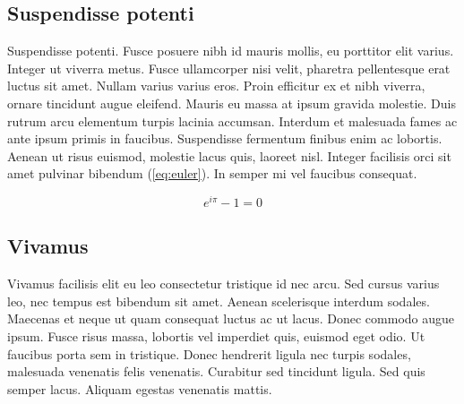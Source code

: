 \subsection{Suspendisse potenti}
Suspendisse potenti. Fusce posuere nibh id mauris mollis, eu porttitor elit varius. Integer ut viverra metus. Fusce ullamcorper nisi velit, pharetra pellentesque erat luctus sit amet. Nullam varius varius eros. Proin efficitur ex et nibh viverra, ornare tincidunt augue eleifend. Mauris eu massa at ipsum gravida molestie. Duis rutrum arcu elementum turpis lacinia accumsan. Interdum et malesuada fames ac ante ipsum primis in faucibus. Suspendisse fermentum finibus enim ac lobortis. Aenean ut risus euismod, molestie lacus quis, laoreet nisl. Integer facilisis orci sit amet pulvinar bibendum (\ref{eq:euler}). In semper mi vel faucibus consequat.

\begin{equation}\label{eq:euler}
    e^{i\pi} -1 = 0
\end{equation}

\subsection{Vivamus}
Vivamus facilisis elit eu leo consectetur tristique id nec arcu. Sed cursus varius leo, nec tempus est bibendum sit amet. Aenean scelerisque interdum sodales. Maecenas et neque ut quam consequat luctus ac ut lacus. Donec commodo augue ipsum. Fusce risus massa, lobortis vel imperdiet quis, euismod eget odio. Ut faucibus porta sem in tristique. Donec hendrerit ligula nec turpis sodales, malesuada venenatis felis venenatis. Curabitur sed tincidunt ligula. Sed quis semper lacus. Aliquam egestas venenatis mattis. \citep{lamport}